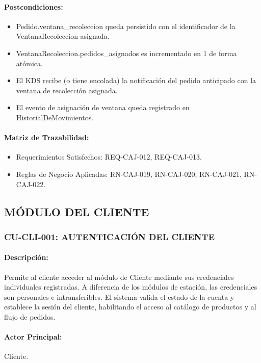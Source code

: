 \paragraph{Postcondiciones:}
\begin{itemize}
    \item Pedido.ventana\_recoleccion queda persistido con el identificador de la VentanaRecoleccion asignada.
    \item VentanaRecoleccion.pedidos\_asignados es incrementado en 1 de forma atómica.
    \item El KDS recibe (o tiene encolada) la notificación del pedido anticipado con la ventana de recolección asignada.
    \item El evento de asignación de ventana queda registrado en HistorialDeMovimientos.
\end{itemize}

\paragraph{Matriz de Trazabilidad:}
\begin{itemize}
    \item Requerimientos Satisfechos: REQ-CAJ-012, REQ-CAJ-013.
    \item Reglas de Negocio Aplicadas: RN-CAJ-019, RN-CAJ-020, RN-CAJ-021, RN-CAJ-022.
\end{itemize}

\subsection{MÓDULO DEL CLIENTE}
\subsubsection{CU-CLI-001: AUTENTICACIÓN DEL CLIENTE}
\paragraph{Descripción:} Permite al cliente acceder al módulo de Cliente mediante sus credenciales individuales registradas. A diferencia de los módulos de estación, las credenciales son personales e intransferibles. El sistema valida el estado de la cuenta y establece la sesión del cliente, habilitando el acceso al catálogo de productos y al flujo de pedidos.

\paragraph{Actor Principal:} Cliente.

